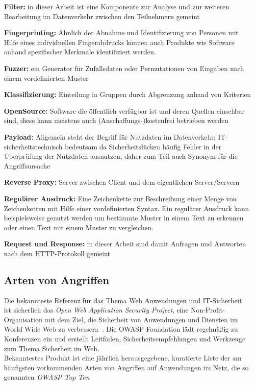 \textbf{Filter:} in dieser Arbeit ist eine Komponente zur Analyse und zur weiteren Bearbeitung im Datenverkehr zwischen den Teilnehmern gemeint

\textbf{Fingerprinting:} Ähnlich der Abnahme und Identifizierung von Personen mit Hilfe eines individuellen Fingerabdrucks können auch Produkte wie Software anhand spezifischer Merkmale identifiziert werden.

\textbf{Fuzzer:} ein Generator für Zufallsdaten oder Permutationen von Eingaben nach einem vordefinierten Muster

\textbf{Klassifizierung:} Einteilung in Gruppen durch Abgrenzung anhand von Kriterien

\textbf{OpenSource:} Software die öffentlich verfügbar ist und deren Quellen einsehbar sind, diese kann meistens auch (Anschaffungs-)kostenfrei betrieben werden

\textbf{Payload:} Allgemein steht der Begriff für Nutzdaten im Datenverkehr; IT-sicherheitstechnisch bedeutsam da Sicherheitslücken häufig Fehler in der Überprüfung der Nutzdaten ausnutzen, daher zum Teil auch Synonym für die Angriffsursache

\textbf{Reverse Proxy:} Server zwischen Client und dem eigentlichen Server/Servern 

\textbf{Regulärer Ausdruck:} Eine Zeichenkette zur Beschreibung einer Menge von Zeichenketten mit Hilfe einer vordefinierten Syntax. Ein regulärer Ausdruck kann beispielsweise genutzt werden um bestimmte Muster in einem Text zu erkennen oder einen Text mit einem Muster zu vergleichen.

\textbf{Request und Response:} in dieser Arbeit sind damit Anfragen und Antworten nach dem HTTP-Protokoll gemeint

\subsection{Arten von Angriffen}

Die bekannteste Referenz für das Thema \glqq Web Anwendungen und IT-Sicherheit\grqq{}  ist sicherlich das \emph{Open Web Application Security Project\textsuperscript{\textregistered}}, eine Non-Profit-Organisation mit dem Ziel, die Sicherheit von Anwendungen und Diensten im World Wide Web zu verbessern~\cite{wpowasp}. Die OWASP Foundation lädt regelmäßig zu Konferenzen ein und erstellt Leitfäden, Sicherheitsempfehlungen und Werkzeuge zum Thema Sicherheit im Web.\\
Bekanntestes Produkt ist eine jährlich herausgegebene, kuratierte Liste der am häufigsten vorkommenden Arten von Angriffen auf Anwendungen im Netz, die so genannten \emph{OWASP Top Ten}~\cite{owasp10}

